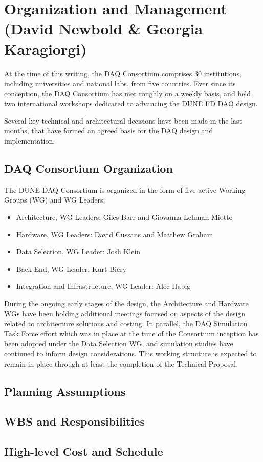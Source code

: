 
\section{Organization and Management (David Newbold \& Georgia Karagiorgi)}
\label{sec:fd-daq-org}

At the time of this writing, the DAQ Consortium comprises 30
institutions, including universities and national labs, from five
countries. Ever since its conception, the DAQ Consortium has met 
roughly on a weekly basis, and held two international workshops
dedicated to advancing the DUNE FD DAQ design.

Several key technical and architectural decisions have been made in
the last months, that have formed an agreed basis for the DAQ design
and implementation.  

\subsection{DAQ Consortium Organization}
\label{sec:fd-daq-org-consortium}

The DUNE DAQ Consortium is organized in the form of five active
Working Groups (WG) and WG Leaders:
\begin{itemize}
\item Architecture, WG Leaders: Giles Barr and Giovanna Lehman-Miotto 
\item Hardware, WG Leaders: David Cussans and Matthew Graham
\item Data Selection, WG Leader: Josh Klein
\item Back-End, WG Leader: Kurt Biery
\item Integration and Infrastructure, WG Leader: Alec Habig
\end{itemize}

During the ongoing early stages of the design, the Architecture and
Hardware WGs have been holding additional meetings focused on aspects
of the design related to architecture solutions and costing. In
parallel, the DAQ Simulation Task Force effort which was in place at
the time of the Consortium inception has been adopted under the Data
Selection WG, and simulation studies have continued to inform design considerations. 
This working structure is expected to remain in place through at least
the completion of the Technical Proposal.

\subsection{Planning Assumptions}
\label{sec:fd-daq-org-assmp}


\subsection{WBS and Responsibilities}
\label{sec:fd-daq-org-wbs}

\subsection{High-level Cost and Schedule}
\label{sec:fd-daq-org-cs}

